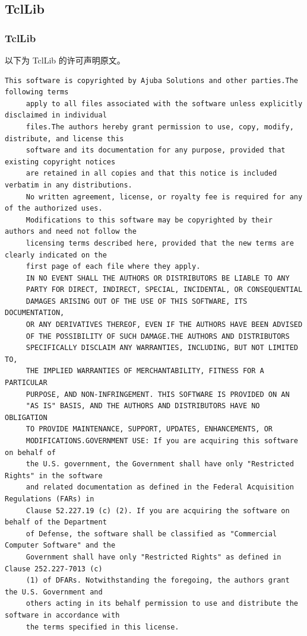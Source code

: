 \subsection{TclLib}
\subsubsection*{TclLib}

以下为 TclLib 的许可声明原文。

\begin{lstlisting}[basicstyle=\ttfamily\footnotesize,breaklines=true]
     This software is copyrighted by Ajuba Solutions and other parties.The following terms
     apply to all files associated with the software unless explicitly disclaimed in individual
     files.The authors hereby grant permission to use, copy, modify, distribute, and license this
     software and its documentation for any purpose, provided that existing copyright notices
     are retained in all copies and that this notice is included verbatim in any distributions.
     No written agreement, license, or royalty fee is required for any of the authorized uses.
     Modifications to this software may be copyrighted by their authors and need not follow the
     licensing terms described here, provided that the new terms are clearly indicated on the
     first page of each file where they apply.
     IN NO EVENT SHALL THE AUTHORS OR DISTRIBUTORS BE LIABLE TO ANY
     PARTY FOR DIRECT, INDIRECT, SPECIAL, INCIDENTAL, OR CONSEQUENTIAL
     DAMAGES ARISING OUT OF THE USE OF THIS SOFTWARE, ITS DOCUMENTATION,
     OR ANY DERIVATIVES THEREOF, EVEN IF THE AUTHORS HAVE BEEN ADVISED
     OF THE POSSIBILITY OF SUCH DAMAGE.THE AUTHORS AND DISTRIBUTORS
     SPECIFICALLY DISCLAIM ANY WARRANTIES, INCLUDING, BUT NOT LIMITED TO,
     THE IMPLIED WARRANTIES OF MERCHANTABILITY, FITNESS FOR A PARTICULAR
     PURPOSE, AND NON-INFRINGEMENT. THIS SOFTWARE IS PROVIDED ON AN
     "AS IS" BASIS, AND THE AUTHORS AND DISTRIBUTORS HAVE NO OBLIGATION
     TO PROVIDE MAINTENANCE, SUPPORT, UPDATES, ENHANCEMENTS, OR
     MODIFICATIONS.GOVERNMENT USE: If you are acquiring this software on behalf of
     the U.S. government, the Government shall have only "Restricted Rights" in the software
     and related documentation as defined in the Federal Acquisition Regulations (FARs) in
     Clause 52.227.19 (c) (2). If you are acquiring the software on behalf of the Department
     of Defense, the software shall be classified as "Commercial Computer Software" and the
     Government shall have only "Restricted Rights" as defined in Clause 252.227-7013 (c)
     (1) of DFARs. Notwithstanding the foregoing, the authors grant the U.S. Government and
     others acting in its behalf permission to use and distribute the software in accordance with
     the terms specified in this license.
\end{lstlisting}

